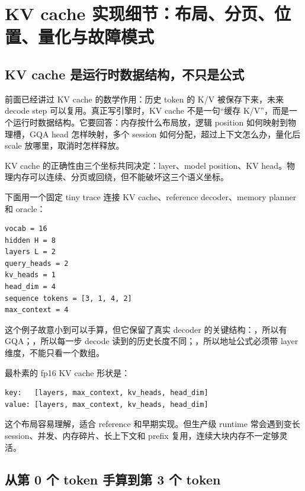 \section{KV cache 实现细节：布局、分页、位置、量化与故障模式}

\subsection{KV cache 是运行时数据结构，不只是公式}

前面已经讲过 KV cache 的数学作用：历史 token 的 K/V 被保存下来，未来 decode step 可以复用。真正写引擎时，KV cache 不是一句“缓存 K/V”，而是一个运行时数据结构。它要回答：内存按什么布局放，逻辑 position 如何映射到物理槽，GQA head 怎样映射，多个 session 如何分配，超过上下文怎么办，量化后 scale 放哪里，取消时怎样释放。

\begin{keyidea}
KV cache 的正确性由三个坐标共同决定：layer、model position、KV head。物理内存可以连续、分页或回绕，但不能破坏这三个语义坐标。
\end{keyidea}

下面用一个固定 tiny trace 连接 KV cache、reference decoder、memory planner 和 oracle：

\begin{lstlisting}[numbers=none,caption={TinyTrace-16 的 KV 参数}]
vocab = 16
hidden H = 8
layers L = 2
query_heads = 2
kv_heads = 1
head_dim = 4
sequence tokens = [3, 1, 4, 2]
max_context = 4
\end{lstlisting}

这个例子故意小到可以手算，但它保留了真实 decoder 的关键结构：，所以有 GQA；，所以每一步 decode 读到的历史长度不同；，所以地址公式必须带 layer 维度，不能只看一个数组。

最朴素的 fp16 KV cache 形状是：

\begin{lstlisting}[numbers=none,caption={连续 KV cache 形状}]
key:   [layers, max_context, kv_heads, head_dim]
value: [layers, max_context, kv_heads, head_dim]
\end{lstlisting}

这个布局容易理解，适合 reference 和早期实现。但生产级 runtime 常会遇到变长 session、并发、内存碎片、长上下文和 prefix 复用，连续大块内存不一定够灵活。

\subsection{从第 0 个 token 手算到第 3 个 token}

